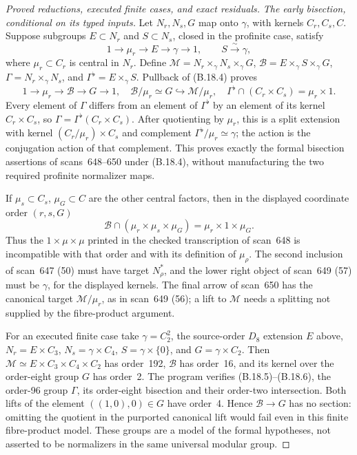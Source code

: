 \begin{proof}[Proved reductions, executed finite cases, and exact residuals]
\emph{The early bisection, conditional on its typed inputs.}
Let \(N_r,N_s,G\) map onto \(\gamma\), with kernels
\(C_r,C_s,C\).  Suppose subgroups \(E\subset N_r\)
and \(S\subset N_s\), closed in the profinite case, satisfy
\[
 1\to\mu_r\to E\to\gamma\to1,\qquad S\xrightarrow{\sim}\gamma,
                                                               \tag{B.18.4}
\]
where \(\mu_r\subset C_r\) is central in \(N_r\).
Define \(\mathcal M=N_r\times_\gamma N_s\times_\gamma G\),
\(\mathcal B=E\times_\gamma S\times_\gamma G\),
\(\Gamma=N_r\times_\gamma N_s\), and
\(\Gamma^\flat=E\times_\gamma S\).
Pullback of (B.18.4) proves
\[
 1\to\mu_r\to\mathcal B\to G\to1,\quad
 \mathcal B/\mu_r\simeq G\hookrightarrow\mathcal M/\mu_r,
 \quad \Gamma^\flat\cap(C_r\times C_s)=\mu_r\times1.
                                                               \tag{B.18.5}
\]
Every element of \(\Gamma\) differs from an element of
\(\Gamma^\flat\) by an element of its kernel
\(C_r\times C_s\), so
\(\Gamma=\Gamma^\flat(C_r\times C_s)\).
After quotienting by \(\mu_r\), this is a split extension
with kernel \((C_r/\mu_r)\times C_s\) and complement
\(\Gamma^\flat/\mu_r\simeq\gamma\); the action is the
conjugation action of that complement.  This proves exactly
the formal bisection assertions of scans~648--650 under
(B.18.4), without manufacturing the two required
profinite normalizer maps.

If \(\mu_s\subset C_s\), \(\mu_G\subset C\) are the
other central factors, then in the displayed coordinate
order \((r,s,G)\)
\[
 \mathcal B\cap(\mu_r\times\mu_s\times\mu_G)
       =\mu_r\times1\times\mu_G.                    \tag{B.18.6}
\]
Thus the \(1\times\mu\times\mu\) printed in the checked
transcription of scan~648 is incompatible with that order
and with its definition of \(\mu_\rho\).
The second inclusion of scan~647 (50) must have target
\(N_\rho^*\), and the lower right object of
scan~649 (57) must be \(\gamma\), for the displayed kernels.
The final arrow of scan~650 has the canonical target
\(\mathcal M/\mu_r\), as in scan~649 (56); a lift to
\(\mathcal M\) needs a splitting not supplied by the
fibre-product argument.

For an executed finite case take \(\gamma=C_2^2\),
the source-order \(D_8\) extension \(E\) above,
\(N_r=E\times C_3\), \(N_s=\gamma\times C_4\),
\(S=\gamma\times\{0\}\), and \(G=\gamma\times C_2\).
Then \(\mathcal M\simeq E\times C_3\times C_4\times C_2\)
has order~192, \(\mathcal B\) has order~16, and its
kernel over the order-eight group \(G\) has order~2.
The program verifies (B.18.5)--(B.18.6), the order-96
group \(\Gamma\), its order-eight bisection and their
order-two intersection.  Both lifts of the element
\(((1,0),0)\in G\) have order~4.  Hence
\(\mathcal B\to G\) has no section: omitting the quotient
in the purported canonical lift would fail even in this
finite fibre-product model.  These groups are a model of
the formal hypotheses, not asserted to be normalizers
in the same universal modular group.


\end{proof}
